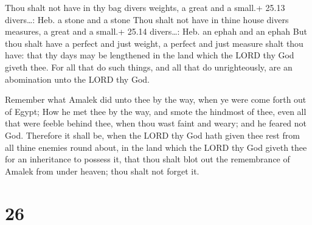  Thou shalt not have in thy bag divers weights, a great
and a small.+ 25.13 divers\ldots: Heb. a stone and a stone 
Thou shalt not have in thine house divers measures, a great and a
small.+ 25.14 divers\ldots: Heb. an ephah and an ephah  But
thou shalt have a perfect and just weight, a perfect and just measure
shalt thou have: that thy days may be lengthened in the land which the
LORD thy God giveth thee.  For all that do such things, and
all that do unrighteously, are an abomination unto the LORD thy God.

 Remember what Amalek did unto thee by the way, when ye
were come forth out of Egypt;  How he met thee by the way,
and smote the hindmost of thee, even all that were feeble behind thee,
when thou wast faint and weary; and he feared not God. 
Therefore it shall be, when the LORD thy God hath given thee rest from
all thine enemies round about, in the land which the LORD thy God giveth
thee for an inheritance to possess it, that thou shalt blot out the
remembrance of Amalek from under heaven; thou shalt not forget it.

\hypertarget{section-25}{%
\section{26}\label{section-25}}

